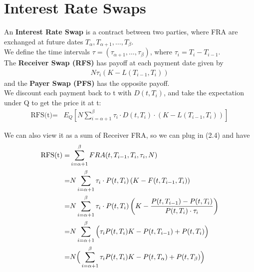 \section{Interest Rate Swaps}
\begin{definition}
    An \textbf{Interest Rate Swap} is a contract between two parties, where FRA are exchanged at future dates $T_{\alpha}, T_{\alpha+1}, \dots, T_{\beta}$.\\
    We define the time intervals $\tau = (\tau_{\alpha+1}, \dots, \tau_{\beta})$, where $\tau_i = T_{i} - T_{i-1}$.\\
    The \textbf{Receiver Swap (RFS)} has payoff at each payment date given by
    \begin{align*}
        N \tau_i (K - L(T_{i-1}, T_i))  
    \end{align*}
    and the  \textbf{Payer Swap (PFS)} has the opposite payoff.\\
    We discount each payment back to t with  $D(t, T_i)$, and take the expectation under Q to get the price it at t:
    \begin{align}
        \text{RFS(t)} =& E_Q\left[ N \sum_{i = \alpha + 1}^{\beta} \tau_i \cdot D(t, T_i) \cdot (K - L(T_{i-1}, T_i)) \right]  
    \end{align}

    We can also view it as a sum of Receiver FRA, so we can plug in (2.4) and have
    \begin{align}
        \text{RFS(t)} =& \sum_{i = \alpha + 1}^{\beta} FRA(t, T_{i-1}, T_i, \tau_i, N) \notag \\
        =& N \sum_{i = \alpha + 1}^{\beta} \tau_i \cdot P(t, T_i) \left( K - F(t, T_{i-1}, T_i) \right) \notag\\
        =& N \sum_{i = \alpha + 1}^{\beta} \tau_i \cdot P(t, T_i)\left( K - \frac{P(t, T_{i-1}) - P(t, T_i)}{P(t, T_i) \cdot \tau_i}\right) \notag\\
        =& N \sum_{i = \alpha + 1}^{\beta} \Big( \tau_i P(t, T_i)  K - P(t, T_{i-1}) + P(t, T_i) \Big) \notag\\
        =& N \Big( \sum_{i = \alpha + 1}^{\beta} \tau_i P(t, T_i)  K - P(t, T_{\alpha}) + P(t, T_{\beta}) \Big) 
    \end{align}
    
    
    
    
    
\end{definition}